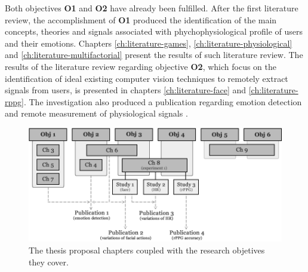 
Both objectives \textbf{O1} and \textbf{O2} have already been fulfilled. After the first literature review, the accomplishment of \textbf{O1} produced the identification of the main concepts, theories and signals associated with phychophysiological profile of users and their emotions. Chapters \ref{ch:literature-games}, \ref{ch:literature-physiological} and \ref{ch:literature-multifactorial} present the results of such literature review. The results of the literature review regarding objective \textbf{O2}, which focus on the identification of ideal existing computer vision techniques to remotely extract signals from users, is presented in chapters \ref{ch:literature-face} and \ref{ch:literature-rppg}. The investigation also produced a publication regarding emotion detection and remote measurement of physiological signals \parencite{bevilacqua2015proposal}.

\begin{figure}[ht]
    \centering
    \includegraphics[width=\textwidth]{figures/research-current-state.png}
    \caption{The thesis proposal chapters coupled with the research objetives they cover.}
    \label{fig:research-current-state}
\end{figure}

